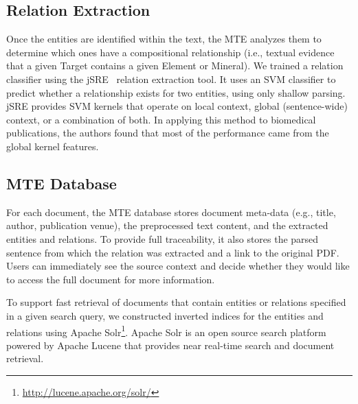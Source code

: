 \documentclass[letterpaper]{article} %
\begin{document}
\subsection{Relation Extraction}

Once the entities are identified within the text, the MTE analyzes them
to determine which ones have a compositional relationship (i.e.,
textual evidence that a given Target contains a given Element or
Mineral).  
%
We trained a relation classifier using the jSRE~\cite{giuliano:jsre06}
relation extraction tool.  It uses an SVM classifier to predict
whether a relationship exists for two entities, using only shallow
parsing.  jSRE provides SVM kernels that operate on local context,
global (sentence-wide) context, or a combination of both.  In applying
this method to biomedical publications, the authors found that most of
the performance came from the global kernel features.


\subsection{MTE Database}

For each document, the MTE database stores document meta-data (e.g.,
title, author, publication venue), the preprocessed text content, and
the extracted entities and relations.  To provide full traceability,
it also stores the parsed sentence from which the relation was
extracted and a link to the original PDF.  Users can immediately see
the source context and decide whether they would like to access the
full document for more information.
 
To support fast retrieval of
documents that contain entities or relations specified in a given
search query, we constructed inverted indices for the entities and
relations using Apache
Solr\footnote{\url{http://lucene.apache.org/solr/}}. Apache Solr is an
open source search platform powered by Apache Lucene that provides
near real-time search and document retrieval. 
 
\end{document}
